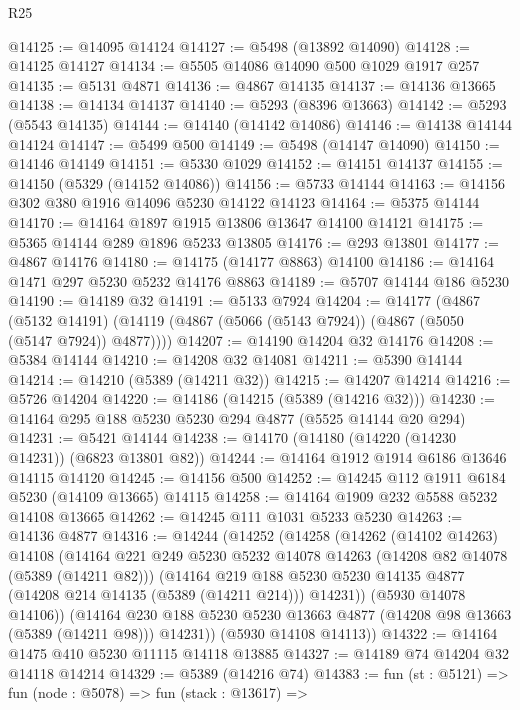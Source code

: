 \begin{lexlean}{R25}
\begin{coremodule}
@14125 := @14095 @14124
@14127 := @5498 (@13892 @14090)
@14128 := @14125 @14127
@14134 := @5505 @14086 @14090 @500 @1029 @1917 @257
@14135 := @5131 @4871
@14136 := @4867 @14135
@14137 := @14136 @13665
@14138 := @14134 @14137
@14140 := @5293 (@8396 @13663)
@14142 := @5293 (@5543 @14135)
@14144 := @14140 (@14142 @14086)
@14146 := @14138 @14144 @14124
@14147 := @5499 @500
@14149 := @5498 (@14147 @14090)
@14150 := @14146 @14149
@14151 := @5330 @1029
@14152 := @14151 @14137
@14155 := @14150 (@5329 (@14152 @14086))
@14156 := @5733 @14144
@14163 := @14156 @302 @380 @1916 @14096 @5230 @14122 @14123
@14164 := @5375 @14144
@14170 := @14164 @1897 @1915 @13806 @13647 @14100 @14121
@14175 := @5365 @14144 @289 @1896 @5233 @13805
@14176 := @293 @13801
@14177 := @4867 @14176
@14180 := @14175 (@14177 @8863) @14100
@14186 := @14164 @1471 @297 @5230 @5232 @14176 @8863
@14189 := @5707 @14144 @186 @5230
@14190 := @14189 @32
@14191 := @5133 @7924
@14204 := @14177
    (@4867
      (@5132 @14191)
      (@14119 (@4867 (@5066 (@5143 @7924)) (@4867 (@5050 (@5147 @7924)) @4877))))
@14207 := @14190 @14204 @32 @14176
@14208 := @5384 @14144
@14210 := @14208 @32 @14081
@14211 := @5390 @14144
@14214 := @14210 (@5389 (@14211 @32))
@14215 := @14207 @14214
@14216 := @5726 @14204
@14220 := @14186 (@14215 (@5389 (@14216 @32)))
@14230 := @14164 @295 @188 @5230 @5230 @294 @4877 (@5525 @14144 @20 @294)
@14231 := @5421 @14144
@14238 := @14170 (@14180 (@14220 (@14230 @14231)) (@6823 @13801 @82))
@14244 := @14164 @1912 @1914 @6186 @13646 @14115 @14120
@14245 := @14156 @500
@14252 := @14245 @112 @1911 @6184 @5230 (@14109 @13665) @14115
@14258 := @14164 @1909 @232 @5588 @5232 @14108 @13665
@14262 := @14245 @111 @1031 @5233 @5230
@14263 := @14136 @4877
@14316 := @14244
    (@14252
      (@14258
        (@14262
          (@14102 @14263)
          @14108
          (@14164
            @221
            @249
            @5230
            @5232
            @14078
            @14263
            (@14208 @82 @14078 (@5389 (@14211 @82)))
            (@14164
              @219
              @188
              @5230
              @5230
              @14135
              @4877
              (@14208 @214 @14135 (@5389 (@14211 @214)))
              @14231))
          (@5930 @14078 @14106))
        (@14164 @230 @188 @5230 @5230 @13663 @4877 (@14208 @98 @13663 (@5389 (@14211 @98))) @14231))
      (@5930 @14108 @14113))
@14322 := @14164 @1475 @410 @5230 @11115 @14118 @13885
@14327 := @14189 @74 @14204 @32 @14118 @14214
@14329 := @5389 (@14216 @74)
@14383 := fun (st : @5121) =>
  fun (node : @5078) =>
  fun (stack : @13617) =>

\end{coremodule}
\end{lexlean}
